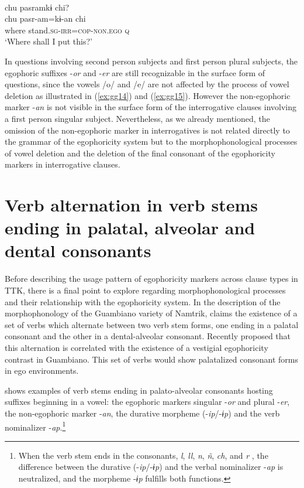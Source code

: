 \documentclass[output=paper]{langsci/langscibook}
\begin{document}
	
\ea \label{ex:gg16}
    \\
	\glll chu	pasramkɨ chi?\\
	chu	pasr-am=kɨ-an chi\\
      where	stand.\textsc{sg-irr=cop-non.ego}	\textsc{q}\\
	\glt ‘Where shall I put this?’
	\z

In questions involving second person subjects and first person plural subjects, the egophoric suffixes -\textit{or} and -\textit{er} are still recognizable in the surface form of questions, since the vowels /o/ and /e/ are not affected by the process of vowel deletion as illustrated in (\ref{ex:gg14}) and (\ref{ex:gg15}). However the non-egophoric marker -\textit{an} is not visible in the surface form of the interrogative clauses involving a first person singular subject. Nevertheless, as we already mentioned, the omission of the non-egophoric marker in interrogatives is not related directly to the grammar of the egophoricity system but to the morphophonological processes of vowel deletion and the deletion of the final consonant of the egophoricity markers in interrogative clauses.


\section{Verb alternation in verb stems ending in palatal, alveolar and dental consonants}\label{s:gg2}

Before describing the usage pattern of egophoricity markers across clause types in TTK, there is a final point to explore regarding morphophonological processes and their relationship with the egophoricity system. In the description of the morphophonology of the Guambiano variety of Namtrik, \citet[58]{Vasquez1987} claims the existence of a set of verbs which alternate between two verb stem forms, one ending in a palatal consonant and the other in a dental-alveolar consonant. Recently \citet{Norcliffe2018} proposed that this alternation is correlated with the existence of a vestigial egophoricity contrast in Guambiano. This set of verbs would show palatalized consonant forms in ego environments. 

 shows examples of verb stems ending in palato-alveolar consonants hosting suffixes beginning in a vowel: the egophoric markers singular -\textit{or} and plural -\textit{er}, the non-egophoric marker -\textit{an}, the durative morpheme (-\textit{ip}/-\textit{ɨp}) and the verb nominalizer -\textit{ap}.\footnote{When the verb stem ends in the consonants, \textit{l}, \textit{ll}, \textit{n}, \textit{ñ}, \textit{ch}, and \textit{r} , the difference between the durative (-\textit{ip}/-\textit{ɨp}) and the verbal nominalizer -\textit{ap}  is neutralized, and the morpheme -\textit{ɨp} fulfills both functions.}
\end{document}
